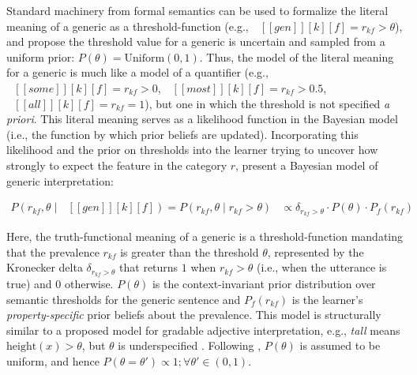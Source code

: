 \documentclass[floatsintext,doc]{apa6}
\newcommand{\denote}[1]{\mbox{ $[\![ #1 ]\!]$}}
\begin{document}
 
Standard machinery from formal semantics \cite{Montague1973} can be used to formalize the literal meaning of a generic as a threshold-function  (e.g., \(\mbox{ $[\![ gen ]\!][k][f]$} = r_{kf} > \theta\)), and  propose the threshold value for a generic is uncertain and sampled from a uniform prior: $P(\theta) = \text{Uniform}(0, 1)$. Thus, the model of the literal meaning for a generic is much like a model of a quantifier  (e.g., \(\mbox{ $[\![ some ]\!][k][f]$} = r_{kf} > 0\), \(\mbox{ $[\![ most ]\!][k][f]$} = r_{kf} > 0.5\), \(\mbox{ $[\![ all ]\!][k][f]$} = r_{kf} = 1\)), but one in which the threshold is not specified \emph{a priori}. 
This literal meaning serves as a likelihood function in the Bayesian model (i.e., the function by which prior beliefs are updated). Incorporating this likelihood and the prior on thresholds into the learner trying to uncover how strongly to expect the feature in the category $r$,  present a Bayesian model of generic interpretation: 

\begin{align}
P (r_{kf}, \theta \mid \denote{gen}[k][f]) = P (r_{kf}, \theta \mid r_{kf} >  \theta) &\propto \delta_{r_{kf} > \theta} \cdot P(\theta) \cdot P_f(r_{kf})  \label{eq:L0}
\end{align}


Here, the truth-functional meaning of a generic is a threshold-function mandating that the prevalence $r_{kf}$ is greater than the threshold \(\theta\), represented by the Kronecker delta $\delta_{r_{kf} > \theta}$ that returns \(1\) when \(r_{kf} > \theta\) (i.e., when the utterance is true) and \(0\) otherwise.
$P(\theta)$ is the context-invariant prior distribution over semantic thresholds for the generic sentence and $P_{f}(r_{kf})$ is the learner's \emph{property-specific} prior beliefs about the prevalence.
This model is structurally similar to a proposed model for gradable adjective interpretation, e.g., \emph{tall} means $\text{height}(x) > \theta$, but $\theta$ is underspecified \cite{Lassiter2015}.
Following , $P(\theta)$ is assumed to be uniform, and hence $P(\theta = \theta') \propto 1; \forall \theta' \in (0, 1)$. 
\end{document}
